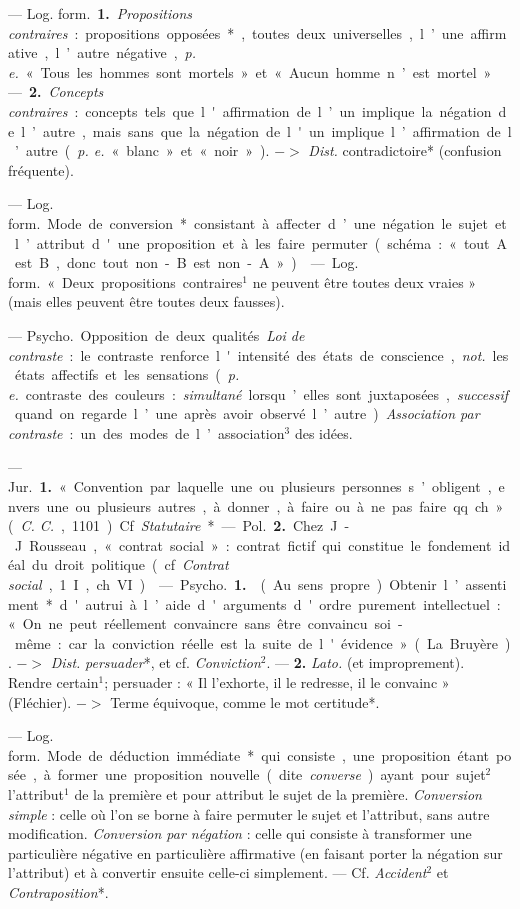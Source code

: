 \begin{itemize}[leftmargin=1cm, label=, itemsep=11pt]
 — \si{Log. form.} {\bf 1.} {\it Propositions contraires} : propositions opposées*, toutes deux universelles, l’une
affirmative, l’autre négative, {\it p. e.}
« Tous les hommes sont mortels » et
« Aucun homme n’est mortel » —
 {\bf 2.} {\it Concepts contraires} : concepts tels
que l'affirmation de l’un implique
la négation de l’autre, mais sans que
la négation de l'un implique l’affirmation de l’autre ({\it p. e.} « blanc » et
« noir »). $->$ {\it Dist.} contradictoire*
(confusion fréquente).

 — \si{Log. form.} Mode
de conversion* consistant à affecter
d’une négation le sujet et l’attribut
d'une proposition et à les faire permuter (schéma : « tout A est B,
donc tout non-B est non-A »).

 — \si{Log. form.} « Deux propositions contraires$^1$
ne peuvent être toutes deux vraies »
(mais elles peuvent être toutes deux
fausses).

 — \si{Psycho.} Opposition de
deux qualités. {\it Loi de contraste} : le
contraste renforce l'intensité des
états de conscience, {\it not.} les états
affectifs et les sensations ({\it p. e.} contraste des couleurs : {\it simultané} lorsqu’elles sont juxtaposées, {\it successif}
quand on regarde l’une après avoir
observé l’autre). {\it Association par contraste} :
un des modes de l’association$^3$ des idées.

 — \si{Jur.} {\bf 1.} « Convention par
laquelle une ou plusieurs personnes
s’obligent, envers une ou plusieurs
autres, à donner, à faire ou à ne
pas faire qq. ch. » ({\it C. C.}, 1101). Cf. {\it Statutaire}*.

— \si{Pol.} {\bf 2.} Chez J.-J. Rousseau,
« contrat social »: contrat fictif qui
constitue le fondement idéal du
droit politique (cf. {\it Contrat social},
1. I, ch. \textsc{VI}).

 — \si{Psycho.} {\bf 1.}  (Au sens
propre). Obtenir l’assentiment*
d'autrui à l’aide d'arguments d'ordre
purement intellectuel : « On ne peut
réellement convaincre sans être
convaincu soi-même: car la conviction réelle est la suite de l'évidence »
(La Bruyère). $->$ {\it Dist.} {\it persuader}*,
et cf. {\it Conviction}$^2$. — {\bf 2.} {\it Lato.} (et
improprement).  Rendre certain$^1$;
persuader : « Il l’exhorte, il le redresse, il le convainc » (Fléchier).
$->$ Terme équivoque, comme le
mot certitude*.

 — \si{Log. form.} Mode de
déduction immédiate* qui consiste,
une proposition étant posée, à former une proposition nouvelle (dite
{\it converse}) ayant pour sujet$^2$ l'attribut$^1$ de la première et pour attribut le sujet de la première. {\it Conversion simple} : celle où l’on se borne à
faire permuter le sujet et l’attribut,
sans autre modification. {\it Conversion
par négation} : celle qui consiste à
transformer une particulière négative en particulière affirmative (en
faisant porter la négation sur l’attribut) et à convertir ensuite celle-ci
simplement. — Cf. {\it Accident}$^2$ et
{\it Contraposition}*.


\end{itemize}
